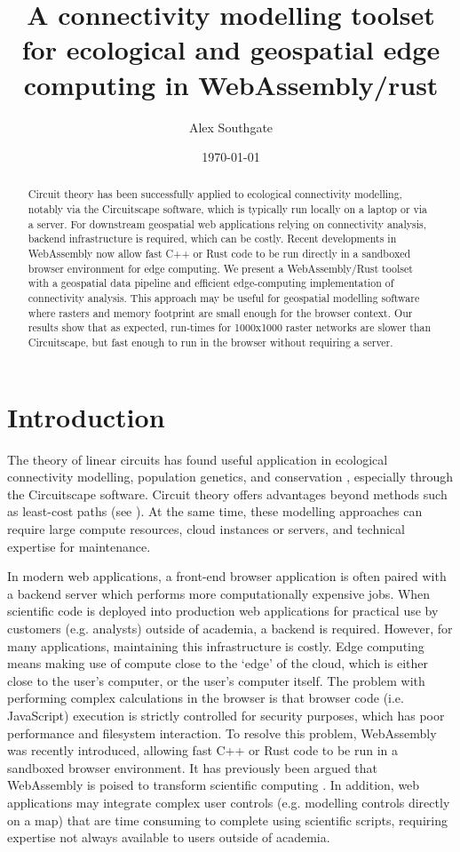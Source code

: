 \documentclass[11pt, a4paper]{article}
\title{A connectivity modelling toolset for ecological and geospatial edge computing in WebAssembly/rust}
\author{Alex Southgate}
\date{\today}
\begin{document}
\maketitle

\begin{abstract}
Circuit theory has been successfully applied to ecological connectivity modelling, notably via the Circuitscape software, which is typically run locally on a laptop or via a server. For downstream geospatial web applications relying on connectivity analysis, backend infrastructure is required, which can be costly. Recent developments in WebAssembly now allow fast C++ or Rust code to be run directly in a sandboxed browser environment for edge computing. We present a WebAssembly/Rust toolset with a geospatial data pipeline and efficient edge-computing implementation of connectivity analysis. This approach may be useful for geospatial modelling software where rasters and memory footprint are small enough for the browser context. Our results show that as expected, run-times for 1000x1000 raster networks are slower than Circuitscape, but fast enough to run in the browser without requiring a server.
\end{abstract}

\section{Introduction}

The theory of linear circuits has found useful application in ecological connectivity modelling, 
population genetics, and conservation \cite{mcrae2008using, mcrae2006isolation, mcrae2007circuit}, 
especially through the Circuitscape \cite{mcrae2016circuitscape} software. 
Circuit theory offers advantages beyond methods such as least-cost paths (see \cite{mcrae2007circuit}).
At the same time, these modelling approaches can require large compute resources, cloud instances or servers,
and technical expertise for maintenance.

In modern web applications, 
a front-end browser application is often paired with a backend server which performs more computationally expensive jobs. 
When scientific code is deployed into production web applications for practical use by customers (e.g. analysts) 
outside of academia, a backend is required. However, for many applications, maintaining this infrastructure is costly. 
Edge computing means making use of compute close to the `edge' of the cloud, 
which is either close to the user's computer, or the user's computer itself. 
The problem with performing complex calculations in the browser is that browser code 
(i.e. JavaScript) execution is strictly controlled for security purposes, which has poor performance and filesystem interaction.
To resolve this problem, WebAssembly was recently introduced,
allowing fast C++ or Rust code to be run in a sandboxed browser environment. 
It has previously been argued that WebAssembly is poised to transform scientific computing \cite{perkel2024no}.
In addition, web applications may integrate complex user controls
(e.g. modelling controls directly on a map) that are time consuming to complete using scientific scripts,
requiring expertise not always available to users outside of academia.
\end{document}
